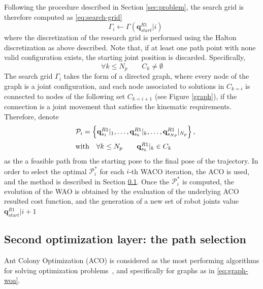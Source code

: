 \documentclass[twocolumn]{svjour3}
\newcommand{\R}[1]{R#1}
\newcommand{\RA}{\R{1}}
\newcommand{\qrA}{\mathbf{q}^{\RA}}
\newcommand{\figref}[1]{Figure \ref{#1}}
\begin{document}
Following the procedure described in Section \ref{sec:problem}, the search grid is therefore computed as \eqref{eq:search-grid}
$$
\quad    \Gamma_i \longleftarrow\Gamma  \left(\qrA_{start}|i\right)
$$
where the discretization of the research grid is performed using the Halton discretization as above described. 
Note that, if at least one path point with none valid configuration exists, the starting joint position is discarded. Specifically,
$$
\forall k \leq N_p \quad \quad C_k \neq \emptyset
$$
The search grid $\Gamma_i$ takes the form of a directed graph, where every node of the graph is a joint configuration, and each node associated to solutions in $C_{k=i} $ is connected to nodes of the following set $C_{k=i+1}$ (see  \figref{graph}), if the connection is a joint movement that satisfies the kinematic requirements.
Therefore, denote 
\begin{equation}\label{eq:graph-woa}
\quad\begin{array}{l}
\mathcal{P}_{i} =\left\{\qrA_{s_1}|_1,\ldots, \qrA_{s_k}|_k, \ldots, \qrA_{s_{Np}}|_{N_p}\right\}, \\ \vspace{-6pt}\\
\mbox{with} \quad \forall k \leq N_{p} \quad\quad \qrA_{s_k}|_k \in C_k 
\end{array}
\end{equation}
as the a feasible path from the starting pose to the final pose of the trajectory. 
In order to select the optimal $\mathcal{P}_{i}^*$ for each $i$-th WACO iteration, the ACO is used, and the method is described in Section \ref{sec_second_layer_ACO}. Once the $\mathcal{P}_{i}^*$ is computed, the evolution of the WAO is obtained by the evaluation of the underlying ACO resulted cost function, and the generation of a new set of robot joints value $\mathbf{q}^{\RA}_{start}|i+1$

\subsection{Second optimization layer: the path selection}
\label{sec_second_layer_ACO}

Ant Colony Optimization (ACO) is considered as the most performing algorithms for solving optimization problems~\cite{Dorigo2006}, and specifically for graphs as in \eqref{eq:graph-woa}.
\end{document}

